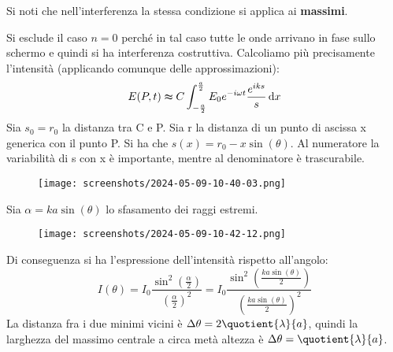 \begin{note}
	Si noti che nell'interferenza la stessa condizione si applica ai \textbf{massimi}.
\end{note}
Si esclude il caso \(n=0\) perché in tal caso tutte le onde arrivano in fase sullo schermo e quindi si ha interferenza costruttiva. Calcoliamo più precisamente l'intensità (applicando comunque delle approssimazioni):
\begin{equation}
	E(P,t) \thickapprox C \int_{-\frac{a}{2}}^{\frac{a}{2}} E_0 e^{-i \omega t} \frac{e^{i k s}}{s} \,\mathrm{d}x 
\end{equation}
Sia \(s_0 =r_0\) la distanza tra C e P. Sia r la distanza di un punto di ascissa x generica con il punto P. Si ha che \(s(x) = r_0 - x \sin (\theta )\). Al numeratore la variabilità di s con x è importante, mentre al denominatore è trascurabile. %
\begin{figure}[H]
	\centering
	\texttt{[image: screenshots/2024-05-09-10-40-03.png]}
\end{figure}
Sia \(\alpha = ka \sin (\theta )\) lo sfasamento dei raggi estremi.
\begin{figure}[H]
	\centering
	\texttt{[image: screenshots/2024-05-09-10-42-12.png]}
\end{figure}
Di conseguenza si ha l'espressione dell'intensità rispetto all'angolo:
\begin{equation}
	I(\theta )=
	I_0 \frac{\sin ^{2} \left( \frac{\alpha}{2} \right) }{\left( \frac{\alpha}{2} \right) ^{2} }=
	I_0 \frac{\sin ^{2} \left( \frac{ka \sin (\theta )}{2} \right) }{\left( \frac{ka \sin (\theta )}{2} \right) ^{2} }
\end{equation}
La distanza fra i due minimi vicini è \(\Delta \theta = 2 \quotient{\lambda }{a} \), quindi la larghezza del massimo centrale a circa metà altezza è \(\Delta \theta = \quotient{\lambda }{a} \).

